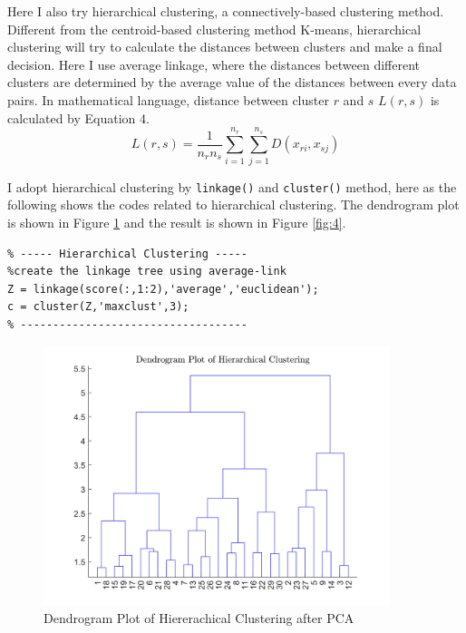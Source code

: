 \documentclass[a4paper,12pt]{article} %
\begin{document}
\hspace{0.7cm}
Here I also try hierarchical clustering, a connectively-based clustering method. Different from the centroid-based clustering method K-means, hierarchical clustering will try to calculate the distances between clusters and make a final decision. Here I use average linkage, where the distances between different clusters are determined by the average value of the distances between every data pairs. In mathematical language, distance between cluster $r$ and $s$ $L(r,s)$ is calculated by Equation 4.
\begin{equation}
	L\left( r,s \right) =\frac{1}{n_rn_s}\sum_{i=1}^{n_r}{\sum_{j=1}^{n_s}{D\left( x_{ri},x_{sj} \right)}}
\end{equation}

\hspace{0.7cm}
I adopt hierarchical clustering by \texttt{linkage()} and \texttt{cluster()} method, here as the following shows the codes related to hierarchical clustering. The dendrogram plot is shown in Figure \ref{fig:3} and the result is shown in Figure \ref{fig:4}.

\begin{footnotesize}
\begin{verbatim}
% ----- Hierarchical Clustering -----
%create the linkage tree using average-link
Z = linkage(score(:,1:2),'average','euclidean'); 
c = cluster(Z,'maxclust',3);
% -----------------------------------
\end{verbatim}
\end{footnotesize}

\begin{figure}[!htbp]
	\centering
	\includegraphics[width=0.9\textwidth]{DEN.jpg}
	\caption{Dendrogram Plot of Hiererachical Clustering after PCA}
	\label{fig:3}
\end{figure}
\end{document}
